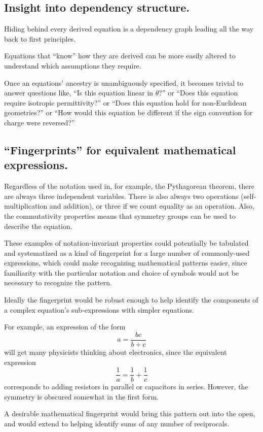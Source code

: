 \documentclass[12pt,letterpaper]{article}
\begin{document}
\subsection{Insight into dependency structure.}

Hiding behind every derived equation is a dependency graph leading all the way back to first principles.

Equations that ``know'' how they are derived can be more easily altered to understand which assumptions they require.

Once an equations' ancestry is unambiguously specified,
it becomes trivial to answer questions like,
``Is this equation linear in $\theta$?''
or
``Does this equation require isotropic permittivity?''
or
``Does this equation hold for non-Euclidean geometries?''
or
``How would this equation be different if the sign convention for charge were reversed?''

\subsection{``Fingerprints'' for equivalent mathematical expressions.}

Regardless of the notation used in,
for example,
the Pythagorean theorem,
there are always three independent variables.
There is also always two operations (self-multiplication and addition),
or three if we count equality as an operation.
Also, the commutativity properties means that symmetry groups can be used to describe the equation.

These examples of notation-invariant properties could potentially be tabulated and systematized
as a kind of fingerprint for a large number of commonly-used expressions,
which could make recognizing mathematical patterns easier,
since familiarity with the particular notation and choice of symbols would not be necessary to recognize the pattern.

Ideally the fingerprint would be robust enough to help identify the components of a complex equation's sub-expressions with simpler equations.

For example, an expression of the form
\[ a = \frac{b c}{b +c} \]
will get many physicists thinking about electronics,
since the equivalent expression
\[ \frac{1}{a} = \frac{1}{b} + \frac{1}{c} \]
corresponds to adding resistors in parallel or capacitors in series.
However, the symmetry is obscured somewhat in the first form.

A desirable mathematical fingerprint would bring this pattern out into the open,
and would extend to helping identify sums of any number of reciprocals.
\end{document}
